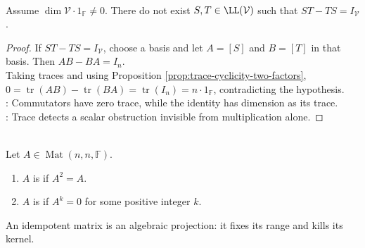 \begin{corollary} \label{cor:identity-is-not-operator-commutator} \\
Assume $\dim\mathcal{V}\cdot1_{\mathbb{F}}\neq0$. There do not exist $S,T\in\LL(\mathcal{V})$ such that $ST-TS=I_{\mathcal{V}}$.
\begin{proof}
If $ST-TS=I_{\mathcal{V}}$, choose a basis and let $A=[S]$ and $B=[T]$ in that basis. Then $AB-BA=I_n$.\\
Taking traces and using Proposition \ref{prop:trace-cyclicity-two-factors}, $0=\operatorname{tr}(AB)-\operatorname{tr}(BA)=\operatorname{tr}(I_n)=n\cdot1_{\mathbb{F}}$, contradicting the hypothesis.\\
: Commutators have zero trace, while the identity has dimension as its trace.\\
: Trace detects a scalar obstruction invisible from multiplication alone.
\end{proof}
\end{corollary}

\begin{definition} \label{def:idempotent-and-nilpotent-matrices} \\
Let $A\in\operatorname{Mat}(n,n,\mathbb{F})$.
\begin{enumerate}[label=(\roman*)]
\setlength{\itemsep}{0pt}
\item $A$ is  if $A^2=A$.
\item $A$ is  if $A^k=0$ for some positive integer $k$.
\end{enumerate}
An idempotent matrix is an algebraic projection: it fixes its range and kills its kernel.
\end{definition}

